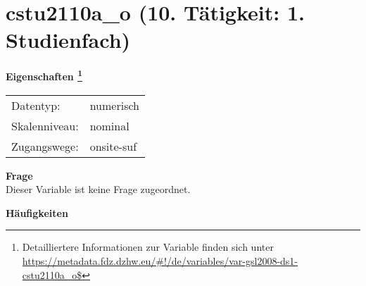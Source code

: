 
    \setcounter{footnote}{0}

    \vspace*{-1.8cm}
	\section{cstu2110a\_o (10. Tätigkeit: 1. Studienfach)}
	\label{section:cstu2110a_o}



    \vspace*{0.5cm}
    \noindent\textbf{Eigenschaften
	\footnote{Detailliertere Informationen zur Variable finden sich unter
		\url{https://metadata.fdz.dzhw.eu/\#!/de/variables/var-gsl2008-ds1-cstu2110a_o$}}}\\
	\begin{tabularx}{\hsize}{@{}lX}
	Datentyp: & numerisch \\
	Skalenniveau: & nominal \\
	Zugangswege: &
	  onsite-suf
 \\
    \end{tabularx}



		\vspace*{0.5cm}
		\noindent\textbf{Frage}\\
		Dieser Variable ist keine Frage zugeordnet.





        		\vspace*{0.5cm}
                \noindent\textbf{Häufigkeiten}

